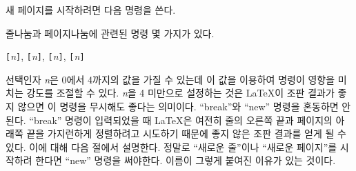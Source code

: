새 페이지를 시작하려면 다음 명령을 쓴다.
\begin{lscommand}
\end{lscommand}

줄나눔과 페이지나눔에 관련된 명령 몇 가지가 있다.
\begin{lscommand}
\verb|[|\emph{n}\verb|]|,
\verb|[|\emph{n}\verb|]|,
\verb|[|\emph{n}\verb|]|,
\verb|[|\emph{n}\verb|]|
\end{lscommand}
\noindent 선택인자 \emph{n}은 0에서 4까지의 값을 가질 수 있는데 이 값을 이용하여 명령이 영향을 미치는 강도를 조절할 수 있다.
\emph{n}을 4 미만으로 설정하는 것은 \LaTeX 이 조판 결과가 좋지 않으면 이 명령을 무시해도 좋다는 의미이다.
``break''와 ``new'' 명령을 혼동하면 안된다. ``break'' 명령이 입력되었을 때 \LaTeX 은 여전히 줄의 오른쪽 끝과 페이지의 아래쪽 끝을
가지런하게 정렬하려고 시도하기 때문에 좋지 않은 조판 결과를 얻게 될 수 있다. 이에 대해 다음 절에서 설명한다.
정말로 ``새로운 줄''이나 ``새로운 페이지''를 시작하려 한다면 ``new'' 명령을 써야한다. 이름이 그렇게 붙여진 이유가 있는 것이다.


